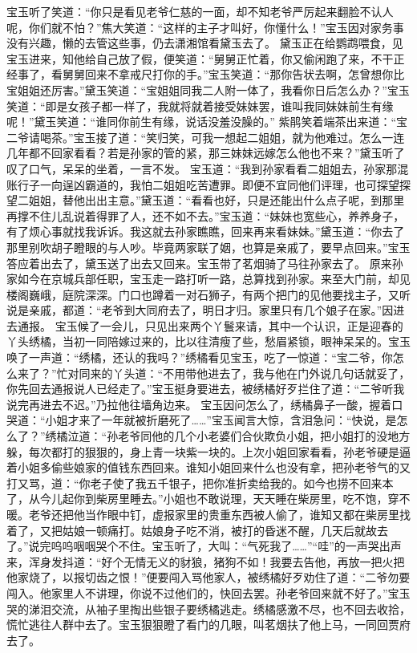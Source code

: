 \documentclass[12pt,oneside]{book}
\begin{document}
宝玉听了笑道：“你只是看见老爷仁慈的一面，却不知老爷严厉起来翻脸不认人呢，你们就不怕？”焦大笑道：“这样的主子才叫好，你懂什么！”宝玉因对家务事没有兴趣，懒的去管这些事，仍去潇湘馆看黛玉去了。
黛玉正在给鹦鹉喂食，见宝玉进来，知他给自己放了假，便笑道：“舅舅正忙着，你又偷闲跑了来，不干正经事了，看舅舅回来不拿戒尺打你的手。”宝玉笑道：“那你告状去啊，怎曾想你比宝姐姐还厉害。”黛玉笑道：“宝姐姐同我二人附一体了，我看你日后怎么办？”宝玉笑道：“即是女孩子都一样了，我就将就着接受妹妹罢，谁叫我同妹妹前生有缘呢！”黛玉笑道：“谁同你前生有缘，说话没羞没臊的。”
紫鹃笑着端茶出来道：“宝二爷请喝茶。”宝玉接了道：“笑归笑，可我一想起二姐姐，就为他难过。怎么一连几年都不回家看看？若是孙家的管的紧，那三妹妹远嫁怎么他也不来？”黛玉听了叹了口气，呆呆的坐着，一言不发。
宝玉道：“我到孙家看看二姐姐去，孙家那混账行子一向逞凶霸道的，我怕二姐姐吃苦遭罪。即便不宜同他们评理，也可探望探望二姐姐，替他出出主意。”黛玉道：“看看也好，只是还能出什么点子呢，到那里再撑不住儿乱说着得罪了人，还不如不去。”宝玉道：“妹妹也宽些心，养养身子，有了烦心事就找我诉诉。我这就去孙家瞧瞧，回来再来看妹妹。”黛玉道：“你去了那里别吹胡子瞪眼的与人吵。毕竟两家联了姻，也算是亲戚了，要早点回来。”宝玉答应着出去了，黛玉送了出去又回来。宝玉带了茗烟骑了马往孙家去了。
原来孙家如今在京城兵部任职，宝玉走一路打听一路，总算找到孙家。来至大门前，却见楼阁巍峨，庭院深深。门口也蹲着一对石狮子，有两个把门的见他要找主子，又听说是亲戚，都道：“老爷到大同府去了，明日才归。家里只有几个娘子在家。”因进去通报。
宝玉候了一会儿，只见出来两个丫鬟来请，其中一个认识，正是迎春的丫头绣橘，当初一同陪嫁过来的，比以往清瘦了些，愁眉紧锁，眼神呆呆的。宝玉唤了一声道：“绣橘，还认的我吗？”绣橘看见宝玉，吃了一惊道：“宝二爷，你怎么来了？”忙对同来的丫头道：“不用带他进去了，我与他在门外说几句话就妥了，你先回去通报说人已经走了。”宝玉挺身要进去，被绣橘好歹拦住了道：“二爷听我说完再进去不迟。”乃拉他往墙角边来。
宝玉因问怎么了，绣橘鼻子一酸，握着口哭道：“小姐才来了一年就被折磨死了……”宝玉闻言大惊，含泪急问：“快说，是怎么了？”绣橘泣道：“孙老爷同他的几个小老婆们合伙欺负小姐，把小姐打的没地方躲，每次都打的狠狠的，身上青一块紫一块的。上次小姐回家看看，孙老爷硬是逼着小姐多偷些娘家的值钱东西回来。谁知小姐回来什么也没有拿，把孙老爷气的又打又骂，道：“你老子使了我五千银子，把你准折卖给我的。如今也捞不回来本了，从今儿起你到柴房里睡去。”小姐也不敢说理，天天睡在柴房里，吃不饱，穿不暖。老爷还把他当作眼中钉，虚报家里的贵重东西被人偷了，谁知又都在柴房里找着了，又把姑娘一顿痛打。姑娘身子吃不消，被打的昏迷不醒，几天后就故去了。”说完呜呜咽咽哭个不住。宝玉听了，大叫：“气死我了……”“哇”的一声哭出声来，浑身发抖道：“好个无情无义的豺狼，猪狗不如！我要去告他，再放一把火把他家烧了，以报切齿之恨！”便要闯入骂他家人，被绣橘好歹劝住了道：“二爷勿要闯入。他家里人不讲理，你说不过他们的，快回去罢。孙老爷回来就不好了。”宝玉哭的涕泪交流，从袖子里掏出些银子要绣橘逃走。绣橘感激不尽，也不回去收拾，慌忙逃往人群中去了。宝玉狠狠瞪了看门的几眼，叫茗烟扶了他上马，一同回贾府去了。
\end{document}
